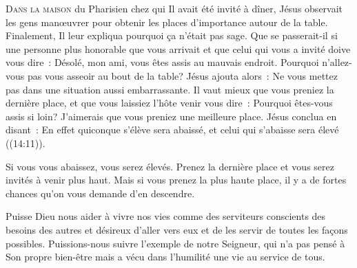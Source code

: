 
\lettrine{D}{ans la maison} du Pharisien chez qui Il avait été invité à dîner,
 Jésus observait les gens manœuvrer pour obtenir les places
 d'importance autour de la table. Finalement, Il leur expliqua pourquoi
 ça n'était pas sage.
 \og Que se passerait-il si une personne plus honorable que vous arrivait
 et que celui qui vous a invité doive vous dire~: 
 \og Désolé, mon ami, vous êtes assis au mauvais endroit.
 Pourquoi n'allez-vous pas vous asseoir au bout de la table? \fg{}
 Jésus ajouta alors~: 
 \og Ne vous mettez pas dans une situation aussi embarrassante.
 Il vaut mieux que vous preniez la dernière place, et que vous laissiez
 l'hôte venir vous dire~: 
 \og Pourquoi êtes-vous assis si loin?
 J'aimerais que vous preniez une meilleure place. \fg{}
 Jésus conclua en disant~:
 \og En effet quiconque s'élève sera abaissé,
 et celui qui s'abaisse sera élevé \fg{} ((14:11)).


Si vous vous abaissez, vous serez élevés.
 Prenez la dernière place et vous serez invités à venir plus haut.
 Mais si vous prenez la plus haute place,
 il y a de fortes chances qu'on vous demande d'en descendre.

Puisse Dieu nous aider à vivre nos vies comme des serviteurs
 \ocadr conscients des besoins des autres et désireux d'aller vers eux
 et de les servir de toutes les façons possibles.
 Puissions-nous suivre l'exemple de notre Seigneur,
 qui n'a pas pensé à Son propre bien-être mais a vécu
 dans l'humilité une vie au service de tous.

\dvrule






